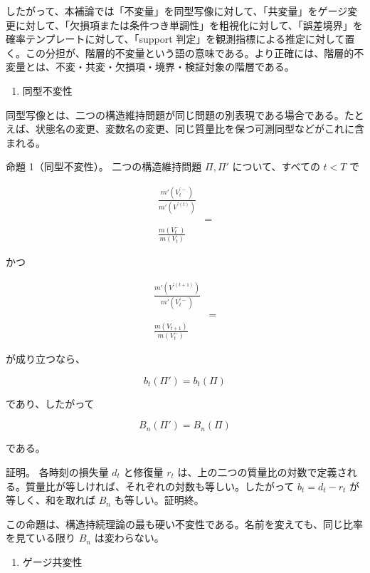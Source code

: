 \documentclass[12pt,a4paper]{article}
\begin{document}
したがって、本補論では「不変量」を同型写像に対して、「共変量」をゲージ変更に対して、「欠損項または条件つき単調性」を粗視化に対して、「誤差境界」を確率テンプレートに対して、「support 判定」を観測指標による推定に対して置く。この分担が、階層的不変量という語の意味である。より正確には、階層的不変量とは、不変・共変・欠損項・境界・検証対象の階層である。

\begin{enumerate}
\def\labelenumi{\arabic{enumi}.}
\setcounter{enumi}{2}
\tightlist
\item
  同型不変性
\end{enumerate}

同型写像とは、二つの構造維持問題が同じ問題の別表現である場合である。たとえば、状態名の変更、変数名の変更、同じ質量比を保つ可測同型などがこれに含まれる。

命題 1（同型不変性）。 二つの構造維持問題 \(\Pi,\Pi'\) について、すべての \(t<T\) で

\[
\begin{aligned}
\frac{m'(V_{t}^{\prime -})}{m'(V^{\prime(t)})} \\
&= \\
\frac{m(V_{t}^-)}{m(V_{t})}
\end{aligned}
\]

かつ

\[
\begin{aligned}
\frac{m'(V^{\prime(t+1)})}{m'(V_{t}^{\prime -})} \\
&= \\
\frac{m(V_{t+1})}{m(V_{t}^-)}
\end{aligned}
\]

が成り立つなら、

\[
b_{t}(\Pi')=b_{t}(\Pi)
\]

であり、したがって

\[
B_{n}(\Pi')=B_{n}(\Pi)
\]

である。

証明。 各時刻の損失量 \(d_{t}\) と修復量 \(r_{t}\) は、上の二つの質量比の対数で定義される。質量比が等しければ、それぞれの対数も等しい。したがって \(b_{t}=d_{t}-r_{t}\) が等しく、和を取れば \(B_{n}\) も等しい。証明終。

この命題は、構造持続理論の最も硬い不変性である。名前を変えても、同じ比率を見ている限り \(B_{n}\) は変わらない。

\begin{enumerate}
\def\labelenumi{\arabic{enumi}.}
\setcounter{enumi}{3}
\tightlist
\item
  ゲージ共変性
\end{enumerate}
\end{document}

